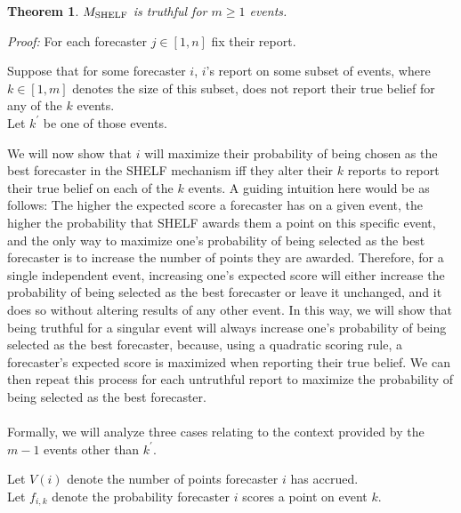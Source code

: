 \documentclass[letterpaper,12pt]{article}
\newcommand{\1}{\mathbbm{1}}
\newtheorem{theorem}{Theorem}
\begin{document}
\begin{theorem}
  \label{shelf_truthful}
    $M_{\mathrm{SHELF}}$ is truthful for $m \geq 1$ events.
\end{theorem}
\emph{Proof:} For each forecaster $j \in [1, n]$ fix their report.

Suppose that for some forecaster $i$, $i$'s report on some subset of events, where $k \in [1, m]$ denotes the size of this subset, does not report their true belief for any of the $k$ events.\\
Let $k^\prime$ be one of those events.

We will now show that $i$ will maximize their probability of being chosen as the best forecaster in the SHELF mechanism iff they alter their $k$ reports to report their true belief on each of the $k$ events. A guiding intuition here would be as follows: The higher the expected score a forecaster has on a given event, the higher the probability that SHELF awards them a point on this specific event, and the only way to maximize one's probability of being selected as the best forecaster is to increase the number of points they are awarded. Therefore, for a single independent event, increasing one's expected score will either increase the probability of being selected as the best forecaster or leave it unchanged, and it does so without altering results of any other event. In this way, we will show that being truthful for a singular event will always increase one's probability of being selected as the best forecaster, because, using a quadratic scoring rule, a forecaster's expected score is maximized when reporting their true belief. We can then repeat this process for each untruthful report to maximize the probability of being selected as the best forecaster.\\\\
Formally, we will analyze three cases relating to the context provided by the $m - 1$ events other than $k^\prime$.

Let $V(i)$ denote the number of points forecaster $i$ has accrued.\\
Let $f_{i,k}$ denote the probability forecaster $i$ scores a point on event $k$.\\
\end{document}
